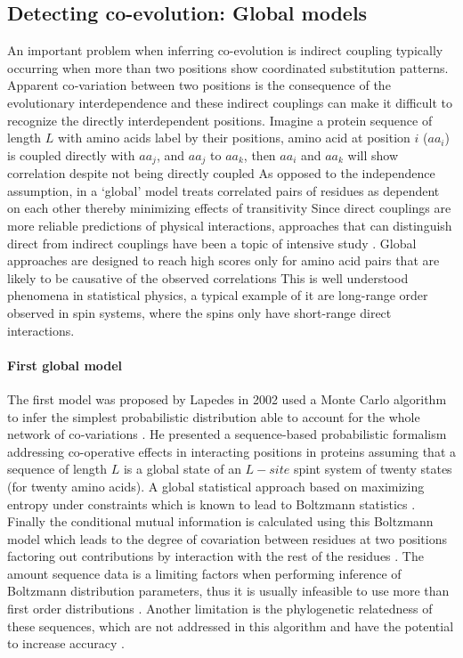 \subsection{Detecting co-evolution: Global models}

An important problem when inferring co-evolution is indirect coupling typically occurring when more than two positions show coordinated substitution patterns.
Apparent co‐variation between two positions is the consequence of the evolutionary interdependence and these indirect couplings can make it difficult to recognize the directly interdependent positions.
Imagine a protein sequence of length $L$ with amino acids label by their positions, amino acid at position $i$ ($aa_i$) is coupled directly with $aa_j$, and $aa_j$ to $aa_k$, then $aa_i$ and $aa_k$ will show correlation despite not being directly coupled \cite{weigt2009identification}
As opposed to the independence assumption, in a `global' model treats correlated pairs of residues as dependent on each other thereby minimizing effects of transitivity  \cite{marks2012protein}
Since direct couplings are more reliable predictions of physical interactions, approaches that can distinguish direct from indirect couplings have been a topic of intensive study \cite{de2013emerging}.
Global approaches are designed to reach high scores only for amino acid pairs that are likely to be causative of the observed correlations \cite{marks2012protein}
This is well understood phenomena in statistical physics, a typical example of it are long-range order observed in spin systems, where the spins only have short-range direct interactions.  \cite{marks2012protein:REF}

\paragraph{First global model}
The first model was proposed by Lapedes in 2002 \cite{lapedes2012using} used a Monte Carlo algorithm to infer the simplest probabilistic distribution able to account for the whole network of co‐variations \cite{de2013emerging}.
He presented a sequence-based probabilistic formalism addressing co-operative effects in interacting positions in proteins assuming that a sequence of length $L$ is a global state of an $L-site$ spint system of twenty states (for twenty amino acids).
A global statistical approach based on maximizing entropy under constraints which is known to lead to Boltzmann statistics \cite{marks2012protein}.
Finally the conditional mutual information is calculated using this Boltzmann model which leads to the degree of covariation between residues at two positions factoring out contributions by interaction with the rest of the residues \cite{marks2012protein}.
The amount sequence data is a limiting factors when performing inference of Boltzmann distribution parameters, thus it is usually infeasible to use more than first order distributions \cite{lapedes2012using}.
Another limitation is the phylogenetic relatedness of these sequences, which are not addressed in this algorithm and have the potential to increase accuracy \cite{lapedes2012using}.

